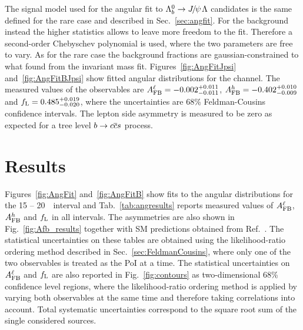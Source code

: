 %
The signal model used for the angular fit to $\Lb\to\jpsi\Lz$ candidates is the same defined
 for the rare case and described in Sec.~\ref{sec:angfit}.
For the background instead the higher statistics allows to leave more freedom to the fit.
Therefore a second-order Chebyschev polynomial is used, where the two parameters are
free to vary. As for the rare case the background fractions are gaussian-constrained
to what found from the invariant mass fit. Figures~\ref{fig:AngFitJpsi} and~\ref{fig:AngFitBJpsi} show
fitted angular distributions for the \jpsi channel. The measured values of the observables
are \mbox{$A_{\rm FB}^\ell = -0.002^{+0.011}_{-0.011}$}, $A_{\rm FB}^h = -0.402^{+0.010}_{-0.009}$
and $f_{\rm L} = 0.485^{+0.019}_{-0.020}$, where the uncertainties are 68\% Feldman-Cousins 
confidence intervals. The lepton side asymmetry is measured to be zero 
as expected for a tree level $b\rightarrow c\overline {c}s$ process.






\section{Results}
\label{sec:afb_results}

Figures~\ref{fig:AngFit} and~\ref{fig:AngFitB} show fits to the angular distributions
for the 15 -- 20~\gevgevcccc ~\qsq interval and 
%
Tab.~\ref{tab:angresults} reports measured values of $A_{\rm FB}^\ell$, $A_{\rm FB}^h$ and $f_{\rm L}$ in all intervals.
The asymmetries are also shown in Fig.~\ref{fig:Afb_results} together with SM predictions obtained from 
Ref.~\cite{Detmold:2012vy}. The statistical uncertainties on these tables 
are obtained using the likelihood-ratio ordering method described in Sec.~\ref{sec:FeldmanCousins}, where only
one of the two observables is treated as the PoI at a time. The statistical uncertainties
on $A_{\rm FB}^\ell$ and $f_{\rm L}$ are also reported in Fig.~\ref{fig:contours} as two-dimensional 68\% confidence level regions,
where the likelihood-ratio ordering method is applied by varying both observables at the same time and therefore taking
correlations into account. Total systematic uncertainties correspond to the square root sum of the
single considered sources.

